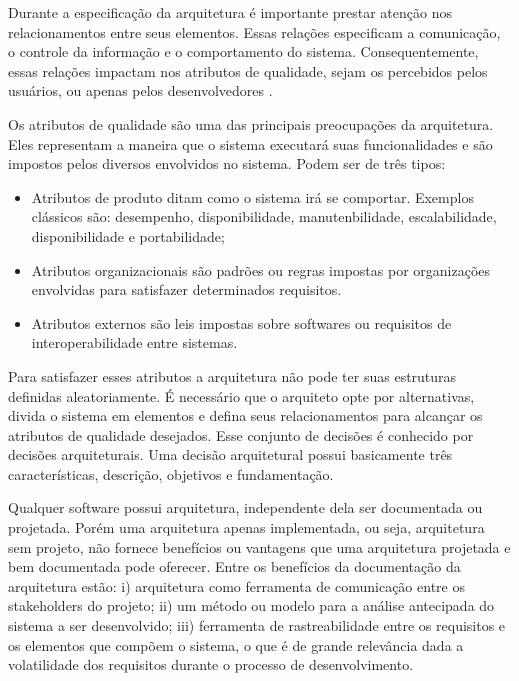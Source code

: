 Durante a especificação da arquitetura é importante prestar atenção nos relacionamentos entre seus elementos. Essas relações especificam a comunicação, o controle da informação e o comportamento do sistema. Consequentemente, essas relações impactam nos atributos de qualidade, sejam os percebidos pelos usuários, ou apenas pelos desenvolvedores \cite{germoglio2010fundamentos}.

Os atributos de qualidade são uma das principais preocupações da arquitetura. Eles representam a maneira que o sistema executará suas funcionalidades e são impostos pelos diversos envolvidos no sistema. Podem ser de três tipos:

\begin{itemize}
\item Atributos de produto ditam como o sistema irá se comportar. Exemplos clássicos são: desempenho, disponibilidade, manutenbilidade, escalabilidade, disponibilidade e portabilidade;
\item Atributos organizacionais são padrões ou regras impostas por organizações envolvidas para satisfazer determinados requisitos. 
\item Atributos externos são leis impostas sobre softwares ou requisitos de interoperabilidade entre sistemas.
\end{itemize}

Para satisfazer esses atributos a arquitetura não pode ter suas estruturas definidas aleatoriamente. É necessário que o arquiteto opte por alternativas, divida o sistema em elementos e defina seus relacionamentos para alcançar os atributos de qualidade desejados. Esse conjunto de decisões é conhecido por decisões arquiteturais. Uma decisão arquitetural possui basicamente três características, descrição, objetivos e fundamentação.


Qualquer software possui arquitetura, independente dela ser documentada ou projetada. Porém uma arquitetura apenas implementada, ou seja, arquitetura sem projeto, não fornece benefícios ou vantagens que uma arquitetura projetada e bem documentada pode oferecer. Entre os benefícios da documentação da arquitetura estão: i) arquitetura como ferramenta de comunicação entre os stakeholders do projeto; ii) um método ou modelo para a análise antecipada do sistema a ser desenvolvido; iii) ferramenta de rastreabilidade entre os requisitos e os elementos que compõem o sistema, o que é de grande relevância dada a volatilidade dos requisitos durante o processo de desenvolvimento.


